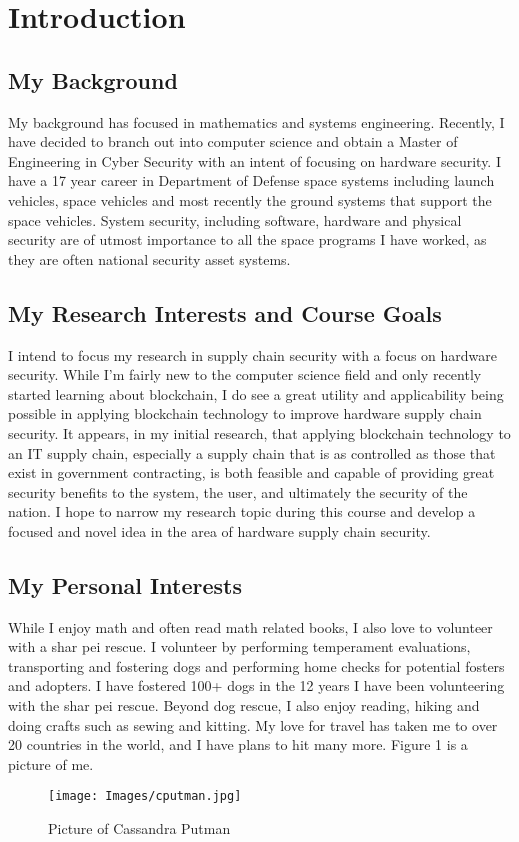 



\section{Introduction}
 \subsection{My Background}
My background has focused in mathematics and systems engineering.  Recently, I have decided to branch out into computer science and obtain a Master of Engineering in Cyber Security with an intent of focusing on hardware security.  I have a 17 year career in Department of Defense space systems including launch vehicles, space vehicles and most recently the ground systems that support the space vehicles.  System security, including software, hardware and physical security are of utmost importance to all the space programs I have worked, as they are often national security asset systems.
\subsection{My Research Interests and Course Goals}
I intend to focus my research in supply chain security with a focus on hardware security. While I'm fairly new to the computer science field and only recently started learning about blockchain, I do see a great utility and applicability being possible in applying blockchain technology to improve hardware supply chain security.  It appears, in my initial research, that applying blockchain technology to an IT supply chain, especially a supply chain that is as controlled as those that exist in government contracting, is both feasible and capable of providing great security benefits to the system, the user, and ultimately the security of the nation. I hope to narrow my research topic during this course and develop a focused and novel idea in the area of hardware supply chain security.
\subsection{My Personal Interests}
While I enjoy math and often read math related books, I also love to volunteer with a shar pei rescue.  I volunteer by performing temperament evaluations, transporting and fostering dogs and  performing home checks for potential fosters and adopters.  I have fostered 100+ dogs in the 12 years I have been volunteering with the shar pei rescue.  Beyond dog rescue, I also enjoy reading, hiking and doing crafts such as sewing and kitting. My love for travel has taken me to over 20 countries in the world, and I have plans to hit many more.  Figure 1 is a picture of me.
\begin{figure}[H]
    \centering
    \texttt{[image: Images/cputman.jpg]}
    \caption{Picture of Cassandra Putman}
    \label{fig:my_label}
\end{figure}





